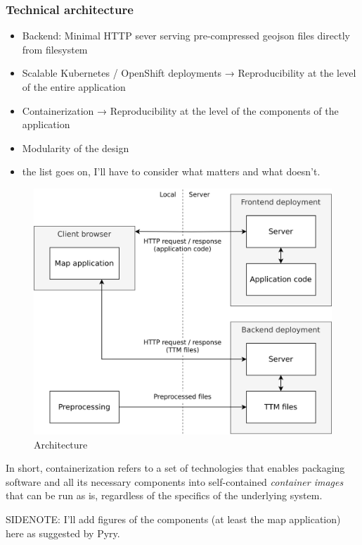 \subsubsection{Technical architecture}

\begin{itemize}
	\item Backend: Minimal HTTP sever serving pre-compressed geojson files directly from filesystem
	\item Scalable Kubernetes / OpenShift deployments → Reproducibility at the level of the entire application
	\item Containerization → Reproducibility at the level of the components of the application
	\item Modularity of the design
	\item the list goes on, I'll have to consider what matters and what doesn't.
\end{itemize}

\begin{figure}[H]
	\centering
	\includegraphics[width=\diagramwidth]{visual/figures/diagrams/architechture.png}
	\caption{Architecture}
	\label{fig:architechture}
\end{figure}

In short, containerization refers to a set of technologies
that enables packaging software and all its necessary components
into self-contained \textit{container images} that can be run as is,
regardless of the specifics of the underlying system.

SIDENOTE: I'll add figures of the components (at least the map application) here as suggested by Pyry.


